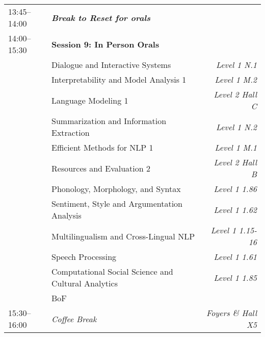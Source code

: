 \begin{xltabular}{\linewidth}{l X r}
    13:45--14:00    &   \textit{\textbf{Break to Reset for orals}}  & \\

    14:00--15:30    &   \textbf{Session 9: In Person Orals}   &   \\
    &   Dialogue and Interactive Systems   &   \textit{Level 1 N.1} \\
    &   Interpretability and Model Analysis 1  &   \textit{Level 1 M.2} \\
    &   Language Modeling 1  &   \textit{Level 2 Hall C} \\
    &   Summarization and Information Extraction  &   \textit{Level 1 N.2} \\
    &   Efficient Methods for NLP 1  &   \textit{Level 1 M.1} \\
    &   Resources and Evaluation 2  &   \textit{Level 2 Hall B} \\
    &   Phonology, Morphology, and Syntax  &   \textit{Level 1 1.86} \\
    &   Sentiment, Style and Argumentation Analysis  &   \textit{Level 1 1.62} \\
    &   Multilingualism and Cross-Lingual NLP  &   \textit{Level 1 1.15-16} \\
    &   Speech Processing   &   \textit{Level 1 1.61} \\
    &   Computational Social Science and Cultural Analytics  &   \textit{Level 1 1.85} \\
    &   BoF &   \\

    15:30--16:00    &   \textit{Coffee Break}    &  \textit{Foyers \& Hall X5} \\


\end{xltabular}
